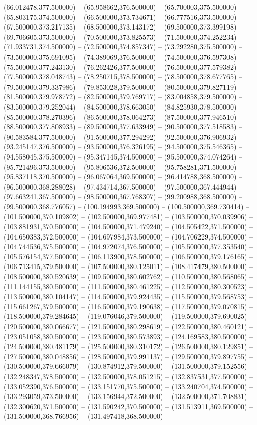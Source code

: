 (66.012478,377.500000) -- (65.958662,376.500000) -- (65.700003,375.500000) -- (65.803175,374.500000) -- (66.500000,373.734671) -- (66.777516,373.500000) -- (67.500000,373.217135) -- (68.500000,373.143172) -- (69.500000,373.399198) -- (69.706605,373.500000) -- (70.500000,373.825573) -- (71.500000,374.252234) -- (71.933731,374.500000) -- (72.500000,374.857347) -- (73.292280,375.500000) -- (73.500000,375.691095) -- (74.389069,376.500000) -- (74.500000,376.597308) -- (75.500000,377.243130) -- (76.262426,377.500000) -- (76.500000,377.579382) -- (77.500000,378.048743) -- (78.250715,378.500000) -- (78.500000,378.677765) -- (79.500000,379.337986) -- (79.853028,379.500000) -- (80.500000,379.827119) -- (81.500000,379.978772) -- (82.500000,379.769717) -- (83.004858,379.500000) -- (83.500000,379.252044) -- (84.500000,378.663050) -- (84.825930,378.500000) -- (85.500000,378.270396) -- (86.500000,378.064273) -- (87.500000,377.946510) -- (88.500000,377.808933) -- (89.500000,377.633949) -- (90.500000,377.518583) -- (90.583584,377.500000) -- (91.500000,377.294292) -- (92.500000,376.906932) -- (93.245147,376.500000) -- (93.500000,376.326195) -- (94.500000,375.546365) -- (94.558045,375.500000) -- (95.347145,374.500000) -- (95.500000,374.074264) -- (95.721496,373.500000) -- (95.806536,372.500000) -- (95.758281,371.500000) -- (95.837118,370.500000) -- (96.067064,369.500000) -- (96.414788,368.500000) -- (96.500000,368.288028) -- (97.434714,367.500000) -- (97.500000,367.444944) -- (97.663241,367.500000) -- (98.500000,367.768307) -- (99.200988,368.500000) -- (99.500000,368.776057) -- (100.194993,369.500000) -- (100.500000,369.730414) -- (101.500000,370.109802) -- (102.500000,369.977481) -- (103.500000,370.039906) -- (103.881931,370.500000) -- (104.500000,371.479240) -- (104.505422,371.500000) -- (104.650383,372.500000) -- (104.697984,373.500000) -- (104.706229,374.500000) -- (104.744536,375.500000) -- (104.972074,376.500000) -- (105.500000,377.353540) -- (105.576154,377.500000) -- (106.113900,378.500000) -- (106.500000,379.176165) -- (106.713415,379.500000) -- (107.500000,380.125011) -- (108.417479,380.500000) -- (108.500000,380.520639) -- (109.500000,380.602762) -- (110.500000,380.568065) -- (111.144155,380.500000) -- (111.500000,380.461225) -- (112.500000,380.300523) -- (113.500000,380.104147) -- (114.500000,379.924435) -- (115.500000,379.568753) -- (115.661267,379.500000) -- (116.500000,379.190638) -- (117.500000,379.070815) -- (118.500000,379.284645) -- (119.076046,379.500000) -- (119.500000,379.690025) -- (120.500000,380.066677) -- (121.500000,380.298619) -- (122.500000,380.460121) -- (123.051058,380.500000) -- (123.500000,380.573893) -- (124.169583,380.500000) -- (124.500000,380.481179) -- (125.500000,380.310172) -- (126.500000,380.129851) -- (127.500000,380.048856) -- (128.500000,379.991137) -- (129.500000,379.897755) -- (130.500000,379.666079) -- (130.874912,379.500000) -- (131.500000,379.152556) -- (132.248347,378.500000) -- (132.500000,378.051215) -- (132.837531,377.500000) -- (133.052390,376.500000) -- (133.151770,375.500000) -- (133.240704,374.500000) -- (133.293059,373.500000) -- (133.156944,372.500000) -- (132.500000,371.708831) -- (132.300620,371.500000) -- (131.590242,370.500000) -- (131.513911,369.500000) -- (131.500000,368.766956) -- (131.497418,368.500000) -- 